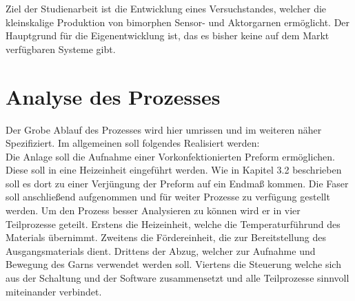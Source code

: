 Ziel der Studienarbeit ist die Entwicklung eines Versuchstandes, welcher die kleinskalige Produktion von bimorphen Sensor- und Aktorgarnen ermöglicht. Der Hauptgrund für die Eigenentwicklung ist, das es bisher keine auf dem Markt verfügbaren Systeme gibt.


\section{ Analyse des Prozesses}
Der Grobe Ablauf des Prozesses wird hier umrissen und im weiteren näher Spezifiziert. 
Im allgemeinen soll folgendes Realisiert werden: \\ 
Die Anlage soll die Aufnahme einer Vorkonfektionierten Preform ermöglichen. Diese soll  in eine Heizeinheit eingeführt werden. Wie in Kapitel 3.2 beschrieben soll es dort zu einer Verjüngung der Preform auf ein Endmaß kommen. Die Faser soll anschließend aufgenommen und für weiter Prozesse zu verfügung gestellt werden.
Um den Prozess besser Analysieren zu können wird er in vier Teilprozesse geteilt. Erstens die Heizeinheit, welche die Temperaturführund des Materials übernimmt. Zweitens die Fördereinheit, die zur Bereitstellung des Ausgangsmaterials dient. Drittens der Abzug, welcher zur Aufnahme und Bewegung des Garns verwendet werden soll. Viertens die Steuerung welche sich aus der Schaltung und der Software zusammensetzt und alle Teilprozesse sinnvoll miteinander verbindet.

